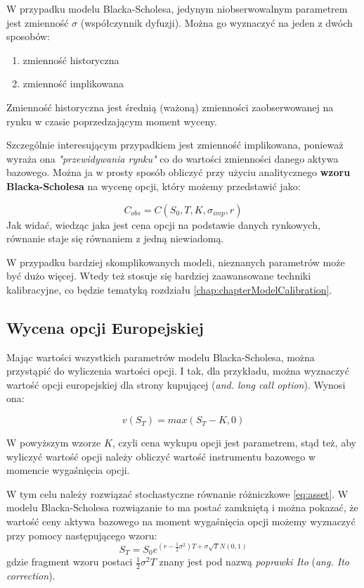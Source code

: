 \documentclass{pracamgr}
\begin{document}
W przypadku modelu Blacka-Scholesa, jedynym niobserwowalnym parametrem jest zmienność $\sigma$ (współczynnik dyfuzji).
Można go wyznaczyć na jeden z dwóch sposobów:
\begin{enumerate}
  \item zmienność historyczna
  \item zmienność implikowana
\end{enumerate}

Zmienność historyczna jest średnią (ważoną) zmienności zaobserwowanej na rynku w czasie poprzedzającym moment wyceny.

Szczególnie interesującym przypadkiem jest zmienność implikowana, ponieważ wyraża ona \textit{"przewidywania rynku"} co 
do wartości zmienności danego aktywa bazowego. 
Można ja w prosty sposób obliczyć przy użyciu analitycznego \textbf{wzoru Blacka-Scholesa} na wycenę opcji, który 
możemy przedstawić jako:

\begin{equation}
  C_{obs} = C(S_0, T, K, \sigma_{imp}, r)
\end{equation}
Jak widać, wiedząc jaka jest cena opcji na podstawie danych rynkowych, równanie staje się równaniem z jedną niewiadomą. 

W przypadku bardziej skomplikowanych modeli, nieznanych parametrów może być dużo więcej. Wtedy też 
stosuje się bardziej zaawansowane techniki kalibracyjne, co będzie tematyką rozdziału \ref{chap:chapterModelCalibration}.


\subsection{Wycena opcji Europejskiej} %
\label{sub:subsection_name}
 
Mając wartości wszystkich parametrów modelu Blacka-Scholesa, można przystąpić
do wyliczenia wartości opcji. I tak, dla przykładu, można wyznaczyć wartość opcji europejskiej dla strony kupującej 
(\textit{and. long call option}). Wynosi ona:

\begin{equation}
  v(S_T) = max(S_T-K, 0)
\end{equation}

W powyższym wzorze $K$, czyli cena wykupu opcji jest parametrem, stąd też, aby wyliczyć wartość opcji należy obliczyć wartość instrumentu bazowego w momencie wygaśnięcia opcji.

W tym celu należy rozwiązać stochastyczne równanie różniczkowe \ref{eq:asset}. W modelu Blacka-Scholesa rozwiązanie to ma
postać zamkniętą i można pokazać, że wartość ceny aktywa bazowego na moment wygaśnięcia opcji możemy wyznaczyć przy 
pomocy następującego wzoru:
\begin{equation}
\label{eq:closedFormBlack} 
  S_T = S_0 e^{(r - \frac{1}{2} \sigma^2)T+\sigma \sqrt{T} N(0,1)}
\end{equation}
gdzie fragment wzoru postaci $\frac{1}{2} \sigma^2 T$ znany jest pod nazwą \textit{poprawki Ito} (\textit{ang. Ito correction}).
\end{document}
